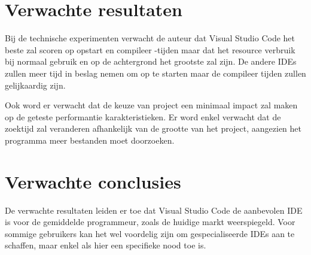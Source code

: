 \section{Verwachte resultaten}
\label{sec:verwachte_resultaten}

Bij de technische experimenten verwacht de auteur dat Visual Studio Code het beste zal scoren op opstart en compileer -tijden maar dat het resource verbruik bij normaal gebruik en op de achtergrond het grootste zal zijn. De andere IDEs zullen meer tijd in beslag nemen om op te starten maar de compileer tijden zullen gelijkaardig zijn.

Ook word er verwacht dat de keuze van project een minimaal impact zal maken op de geteste performantie karakteristieken. Er word enkel verwacht dat de zoektijd zal veranderen afhankelijk van de grootte van het project, aangezien het programma meer bestanden moet doorzoeken.

\section{Verwachte conclusies}
\label{sec:verwachte_conclusies}

De verwachte resultaten leiden er toe dat Visual Studio Code de aanbevolen IDE is voor de gemiddelde programmeur, zoals de huidige markt weerspiegeld. Voor sommige gebruikers kan het wel voordelig zijn om gespecialiseerde IDEs aan te schaffen, maar enkel als hier een specifieke nood toe is.
